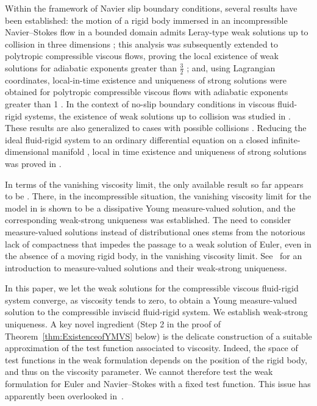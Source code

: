 \documentclass[11pt,twoside,reqno]{amsart}
\numberwithin{equation}{section}
\numberwithin{figure}{section}
\begin{document}
Within the framework of Navier slip boundary conditions, several results have been established: the motion of a rigid body immersed in an incompressible Navier–Stokes flow in a bounded domain admits Leray-type weak solutions up to collision in three dimensions \cite{gerard2014existence}; this analysis was subsequently extended to polytropic compressible viscous flows, proving the local existence of weak solutions for adiabatic exponents greater than $\tfrac{3}{2}$ \cite{nevcasova2022motion}; and, using Lagrangian coordinates, local-in-time existence and uniqueness of strong solutions were obtained for polytropic compressible viscous flows with adiabatic exponents greater than 1 \cite{djebour2023existence}.  In the context of no-slip boundary conditions in viscous fluid-rigid systems, the existence of weak solutions up to collision was studied in \cite{MR1682663,MR1765138,MR1781915,MR1725677}. These results are also generalized to cases with possible collisions \cite{MR1870954,MR2019028,MR1981859}. Reducing the ideal fluid-rigid system to an ordinary differential equation on a closed infinite-dimensional manifold \cite{MR344713}, local in time existence and uniqueness of strong solutions was proved in \cite{MR2719277}. 

In terms of the vanishing viscosity limit, the only available result so far appears to be \cite{caggio2021measure}. There, in the incompressible situation, the vanishing viscosity limit for the model in \cite{gerard2014existence} is shown to be a dissipative Young measure-valued solution, and the corresponding weak-strong uniqueness was established. The need to consider measure-valued solutions instead of distributional ones stems from the notorious lack of compactness that impedes the passage to a weak solution of Euler, even in the absence of a moving rigid body, in the vanishing viscosity limit. See~\cite{wiedemannsurvey} for an introduction to measure-valued solutions and their weak-strong uniqueness.  

In this paper, we let the weak solutions for the compressible viscous fluid-rigid system \cite{nevcasova2022motion} converge, as viscosity tends to zero, to obtain a Young measure-valued solution to the compressible inviscid fluid-rigid system. We establish weak-strong uniqueness. A key novel ingredient (Step 2 in the proof of Theorem~\ref{thm:ExistenceofYMVS} below) is the delicate construction of a suitable approximation of the test function associated to viscosity. Indeed, the space of test functions in the weak formulation depends on the position of the rigid body, and thus on the viscosity parameter. We cannot therefore test the weak formulation for Euler and Navier--Stokes with a fixed test function. This issue has apparently been overlooked in~\cite{caggio2021measure}.     
\end{document}
